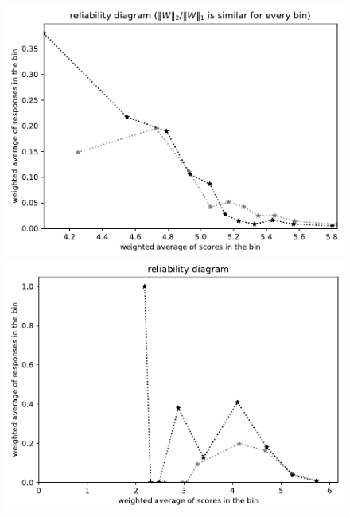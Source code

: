 \documentclass{article}
\newlength{\vertsep}
\newlength{\imsize}
\begin{document}
\begin{figure}
\begin{centering}
\parbox{\imsize}{\includegraphics[width=\imsize]
{../codes/weighted/County_of_San_Francisco_vs_San_Mateo-LNGI/equierrs10.pdf}}
\quad\quad
\parbox{\imsize}{\includegraphics[width=\imsize]
{../codes/weighted/County_of_San_Francisco_vs_San_Mateo-LNGI/equiscores10.pdf}}

\vspace{\vertsep}


\end{centering}
\end{figure}
\end{document}
